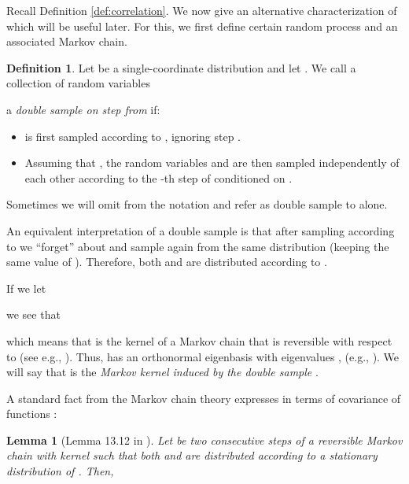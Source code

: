\documentclass{daj}
\newcommand{\1}{\mathbbm{1}}
\theoremstyle{plain}
\newtheorem{lemma}[theorem]{Lemma}
\theoremstyle{definition}
\newtheorem{definition}[theorem]{Definition}
\begin{document}
Recall Definition \ref{def:correlation}.
We now give an alternative characterization of  which will be useful later.
For this, we first define certain random process and an associated Markov chain.
\begin{definition}
\label{def:double-sample}
Let  be a single-coordinate distribution
and let .
We call a collection of random variables 

a \emph{double sample on step  from } if:
\begin{itemize}
\item
   is first sampled according to , ignoring step .
\item Assuming that ,
the random variables  and  are then sampled independently of each other 
according to the
-th step of  conditioned on 
.
\end{itemize}
Sometimes we will omit  from the notation 
and refer as double sample to  alone.
\end{definition}

An equivalent interpretation of a double sample
is that after sampling  according to
 we ``forget'' about  and sample  again from the same distribution
(keeping the same value of ).
Therefore, both
 and 
are distributed
according to .

If we let

we see that

which means that  is the kernel of a Markov chain that is reversible with
respect to  (see e.g., \cite[Section 1.6]{LevinPW08}).  Thus,  has an
orthonormal eigenbasis with eigenvalues
, 
(e.g., \cite[Lemma 12.2]{LevinPW08}).
We will say that  is the \emph{Markov kernel induced by the double sample
  }.
  
A standard fact from the Markov chain theory
expresses  in terms of covariance of functions
:
\begin{lemma}[Lemma 13.12 in \cite{LevinPW08}]
  Let  be two consecutive steps of a reversible Markov chain with kernel
   such that both  and  are distributed according to a stationary
  distribution of . Then,
\label{lem:lambda-lpw}

\end{lemma}
\end{document}
